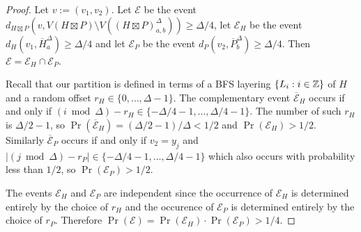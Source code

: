 \documentclass{patmorin}
\renewcommand{\ge}{\geqslant}
\begin{document}
\begin{proof}
  Let $v:=(v_1,v_2)$.
  Let $\mathcal{E}$ be the event $d_{H\boxtimes P}(v, V(H\boxtimes P)\setminus V((H\boxtimes P)_{a,b}^\Delta)) \ge \Delta/4$, let $\mathcal{E}_H$ be the event $d_{H}(v_1, \overline{H}^\Delta_a)\ge\Delta/4$ and let $\mathcal{E}_P$ be the event $d_{P}(v_2, \overline{P}^\Delta_b)\ge\Delta/4$.  Then $\mathcal{E}=\mathcal{E}_H\cap\mathcal{E}_P$.

  Recall that our partition is defined in terms of a BFS layering $\{L_i:i\in\mathbb{Z}\}$ of $H$ and a random offset $r_H\in\{0,\ldots,\Delta-1\}$.
  The complementary event $\overline{\mathcal{E}}_H$ occurs if and only if $(i\bmod\Delta)-r_H\in\{-\Delta/4-1,\ldots,\Delta/4-1\}$. The number of such $r_H$ is $\Delta/2-1$, so $\Pr(\overline{\mathcal{E}}_H)=(\Delta/2-1)/\Delta < 1/2$ and $\Pr(\mathcal{E}_H)>1/2$.  Similarly $\overline{\mathcal{E}}_P$ occurs if and only if $v_2=y_j$ and $|(j\bmod\Delta)-r_P|\in\{-\Delta/4-1,\ldots,\Delta/4-1\}$ which also occurs with probability less than $1/2$, so $\Pr(\mathcal{E}_P)> 1/2$.

  The events $\mathcal{E}_H$ and $\mathcal{E}_P$ are independent since the occurrence of $\mathcal{E}_H$ is determined entirely by the choice of $r_H$ and the occurence of $\mathcal{E}_P$ is determined entirely by the choice of $r_P$.
  Therefore $\Pr(\mathcal{E})=\Pr(\mathcal{E}_H)\cdot\Pr(\mathcal{E}_P) > 1/4$.
\end{proof}
\end{document}
